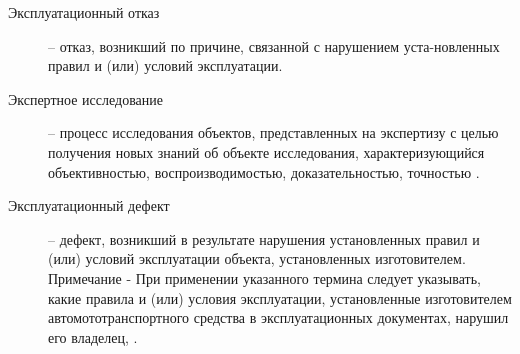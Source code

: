 \begin{description}
	
	\item
	[Эксплуатационный отказ] -- отказ, возникший по причине, связанной с нарушением уста-новленных правил и (или) условий эксплуатации.
	
	\item[Экспертное исследование] -- процесс исследования объектов, представленных на экспертизу с целью получения новых знаний об объекте исследования, характеризующийся объективностью, воспроизводимостью, доказательностью, точностью  \cite[п.3.74]{271022021:gost}.
	
%	
	
	
	
	\item
	[Эксплуатационный дефект] -- дефект, возникший в результате нарушения установленных правил и (или) условий эксплуатации объекта, установленных изготовителем. Примечание - При применении указанного термина следует указывать, какие правила и (или) условия эксплуатации, установленные изготовителем автомототранспортного средства в эксплуатационных документах, нарушил его владелец, \cite[п.76]{271022021:gost}.
	

\end{description}
